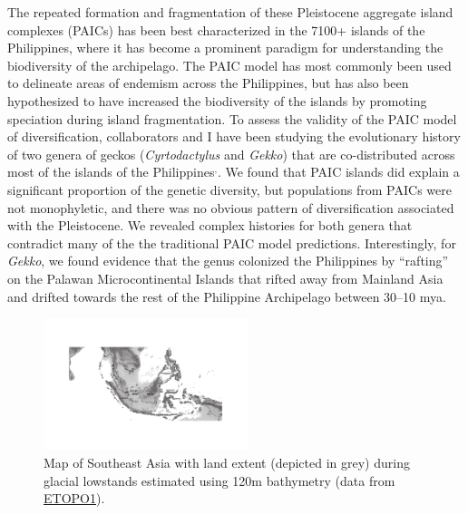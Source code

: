 \documentclass[10pt]{article}
\newcommand{\super}[1]{\ensuremath{^{\textrm{#1}}}}
\begin{document}
The repeated formation and fragmentation of these Pleistocene aggregate island complexes (PAICs) has been best characterized in the 7100+ islands of the Philippines, where it has become a prominent paradigm for understanding the biodiversity of the archipelago.
The PAIC model has most commonly been used to delineate areas of endemism across the Philippines, but has also been hypothesized to have increased the biodiversity of the islands by promoting speciation during island fragmentation.
To assess the validity of the PAIC model of diversification, collaborators and I have been studying the evolutionary history of two genera of geckos (\emph{Cyrtodactylus} and \emph{Gekko}) that are co-distributed across most of the islands of the Philippines\super{,}.
We found that PAIC islands did explain a significant proportion of the genetic diversity, but populations from PAICs were not monophyletic, and there was no obvious pattern of diversification associated with the Pleistocene.
We revealed complex histories for both genera that contradict many of the the traditional PAIC model predictions.
Interestingly, for \emph{Gekko}, we found evidence that the genus colonized the Philippines by ``rafting'' on the Palawan Microcontinental Islands that rifted away from Mainland Asia and drifted towards the rest of the Philippine Archipelago between 30--10 mya.

\begin{figure}
  \vspace{-1.5em}
  \begin{center}
    \includegraphics[width=0.53\textwidth]{sunda_shelf_small.pdf}
  \end{center}
  \vspace{-0.2em}
  \caption{Map of Southeast Asia with land extent (depicted in grey) during glacial lowstands estimated using 120m bathymetry (data from \href{http://ngdc.noaa.gov/mgg/global/global.html}{ETOPO1}).}
  \label{map}
  \vspace{-1.1em}
\end{figure}
\end{document}
